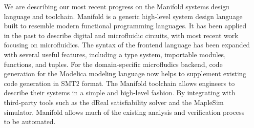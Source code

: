 We are describing our most recent progress on the Manifold systems design language and toolchain.
Manifold is a generic high-level system design language built to resemble modern functional programming languages.
It has been applied in the past to describe digital and microfluidic circuits, with most recent work focusing on microfluidics.
The syntax of the frontend language has been expanded with several useful features, including a type system, importable modules, functions, and tuples.
For the domain-specific microfludics backend, code generation for the Modelica modeling language now helps to supplement existing code generation in SMT2 format.
The Manifold toolchain allows engineers to describe their systems in a simple and high-level fashion.
By integrating with third-party tools such as the dReal satisfiability solver and the MapleSim simulator, Manifold allows much of the existing analysis and verification process to be automated.

